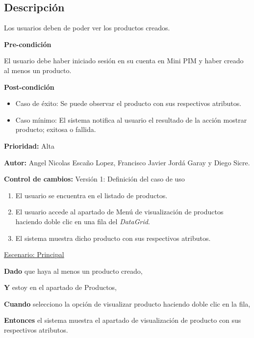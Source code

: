 
\subsection*{Descripción}
Los usuarios deben de poder ver los productos creados.\par
\vspace{0.15cm}

\textbf{Pre-condición}\par
El usuario debe haber iniciado sesión en su cuenta en Mini PIM y haber creado al menos un producto.\par
\vspace{0.15cm}

\textbf{Post-condición}
\begin{itemize}
    \item Caso de éxito: Se puede observar el producto con sus respectivos atributos.
    \item Caso mínimo: El sistema notifica al usuario el resultado de la acción mostrar producto; exitosa o fallida.
\end{itemize}

\textbf{Prioridad: }
Alta
\vspace{0.15cm}

\textbf{Autor: }
Angel Nicolas Escaño Lopez, Francisco Javier Jordá Garay y Diego Sicre.\par
\vspace{0.15cm}

\textbf{Control de cambios: } Versión 1: Definición del caso de uso

\begin{enumerate}
    \item El usuario se encuentra en el listado de productos.
    \item El usuario accede al apartado de Menú de visualización de productos haciendo doble clic en una fila del \textit{DataGrid}.
    \item El sistema muestra dicho producto con sus respectivos atributos.
\end{enumerate}

\underline{Escenario: Principal}\par
\vspace{0.15cm}
\textbf{Dado} que haya al menos un producto creado,\par
\textbf{Y} estoy en el apartado de Productos,\par
\textbf{Cuando} selecciono la opción de visualizar producto haciendo doble clic en la fila,\par
\textbf{Entonces} el sistema muestra el apartado de visualización de producto con sus respectivos atributos.\par
\vspace{0.20cm}




